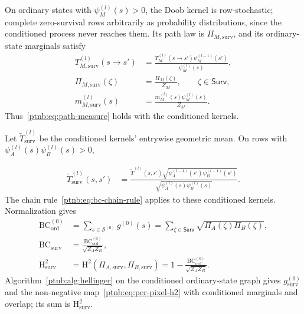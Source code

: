 \begin{theoremenv}
On ordinary states with $\psi_M^{(l)}(s)>0$, the Doob kernel is row-stochastic; complete zero-survival rows arbitrarily as probability distributions, since the conditioned process never reaches them. Its path law is $\Pi_{M,\mathrm{surv}}$, and its ordinary-state marginals satisfy
\begin{align}
 T_{M,\mathrm{surv}}^{(l)}(s\to s')
 &=\frac{T_M^{(l)}(s\to s')\psi_M^{(l-1)}(s')}{\psi_M^{(l)}(s)},
 \label{ptnb:eq:conditioned-kernel}\\
 \Pi_{M,\mathrm{surv}}(\zeta)
 &=\frac{\Pi_M(\zeta)}{Z_M},\qquad \zeta\in\mathsf{Surv},
 \label{ptnb:eq:conditioned-path-measure}\\
 m_{M,\mathrm{surv}}^{(l)}(s)
 &=\frac{m_M^{(l)}(s)\psi_M^{(l)}(s)}{Z_M}.
 \label{ptnb:eq:conditioned-alpha}
\end{align}
Thus~\eqref{ptnb:eq:path-measure} holds with the conditioned kernels.
{\setlength{\emergencystretch}{4em}%
Let $\widetilde T_{\mathrm{surv}}^{(l)}$ be the conditioned kernels' entrywise geometric mean. On rows with $\psi_A^{(l)}(s)\psi_B^{(l)}(s)>0$,\par}
\begin{align}
 \widetilde T_{\mathrm{surv}}^{(l)}(s,s')
 &=\frac{\widetilde T^{(l)}(s,s')\sqrt{\psi_A^{(l-1)}(s')\psi_B^{(l-1)}(s')}}
 {\sqrt{\psi_A^{(l)}(s)\psi_B^{(l)}(s)}}.
 \label{ptnb:eq:conditioned-geom-kernel}
\end{align}
The chain rule~\eqref{ptnb:eq:bc-chain-rule} applies to these conditioned kernels. Normalization gives
\begin{align}
 \mathrm{BC}_{\mathrm{ord}}^{(0)}
 &=\sum_{s\in\mathcal S^{(0)}}g^{(0)}(s)
 =\sum_{\zeta\in\mathsf{Surv}}\sqrt{\Pi_A(\zeta)\Pi_B(\zeta)},
 \label{ptnb:eq:ordinary-bc}\\
 \mathrm{BC}_{\mathrm{surv}}&=\frac{\mathrm{BC}_{\mathrm{ord}}^{(0)}}{\sqrt{Z_AZ_B}},
 \label{ptnb:eq:conditioned-bc-posthoc}\\
 \mathrm H_{\mathrm{surv}}^2
 &=\mathrm H^2(\Pi_{A,\mathrm{surv}},\Pi_{B,\mathrm{surv}})
 =1-\frac{\mathrm{BC}_{\mathrm{ord}}^{(0)}}{\sqrt{Z_AZ_B}}.
 \label{ptnb:eq:conditioned-h2}
\end{align}
Algorithm~\ref{ptnb:alg:hellinger} on the conditioned ordinary-state graph gives $g_{\mathrm{surv}}^{(0)}$ and the non-negative map~\eqref{ptnb:eq:per-pixel-h2} with conditioned marginals and overlap; its sum is $\mathrm H_{\mathrm{surv}}^2$.
\end{theoremenv}

